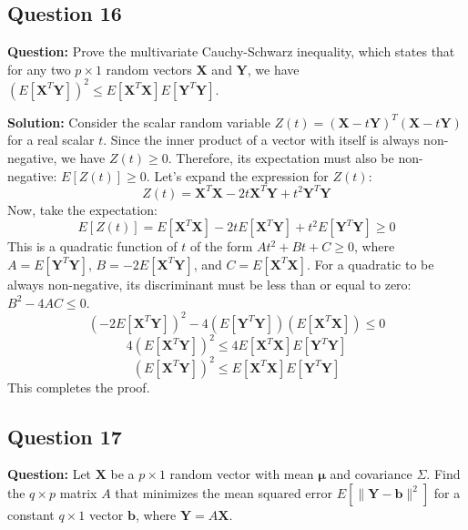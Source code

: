 \subsection*{Question 16}
\textbf{Question:} Prove the multivariate Cauchy-Schwarz inequality, which states that for any two $p \times 1$ random vectors $\mathbf{X}$ and $\mathbf{Y}$, we have $(E[\mathbf{X}^T\mathbf{Y}])^2 \le E[\mathbf{X}^T\mathbf{X}] E[\mathbf{Y}^T\mathbf{Y}]$.

\textbf{Solution:}
Consider the scalar random variable $Z(t) = (\mathbf{X} - t\mathbf{Y})^T(\mathbf{X} - t\mathbf{Y})$ for a real scalar $t$.
Since the inner product of a vector with itself is always non-negative, we have $Z(t) \ge 0$.
Therefore, its expectation must also be non-negative: $E[Z(t)] \ge 0$.
Let's expand the expression for $Z(t)$:
$$ Z(t) = \mathbf{X}^T\mathbf{X} - 2t\mathbf{X}^T\mathbf{Y} + t^2\mathbf{Y}^T\mathbf{Y} $$
Now, take the expectation:
$$ E[Z(t)] = E[\mathbf{X}^T\mathbf{X}] - 2tE[\mathbf{X}^T\mathbf{Y}] + t^2E[\mathbf{Y}^T\mathbf{Y}] \ge 0 $$
This is a quadratic function of $t$ of the form $At^2 + Bt + C \ge 0$, where $A = E[\mathbf{Y}^T\mathbf{Y}]$, $B = -2E[\mathbf{X}^T\mathbf{Y}]$, and $C = E[\mathbf{X}^T\mathbf{X}]$.
For a quadratic to be always non-negative, its discriminant must be less than or equal to zero: $B^2 - 4AC \le 0$.
$$ (-2E[\mathbf{X}^T\mathbf{Y}])^2 - 4(E[\mathbf{Y}^T\mathbf{Y}])(E[\mathbf{X}^T\mathbf{X}]) \le 0 $$
$$ 4(E[\mathbf{X}^T\mathbf{Y}])^2 \le 4 E[\mathbf{X}^T\mathbf{X}] E[\mathbf{Y}^T\mathbf{Y}] $$
$$ (E[\mathbf{X}^T\mathbf{Y}])^2 \le E[\mathbf{X}^T\mathbf{X}] E[\mathbf{Y}^T\mathbf{Y}] $$
This completes the proof.

\subsection*{Question 17}
\textbf{Question:} Let $\mathbf{X}$ be a $p \times 1$ random vector with mean $\boldsymbol{\mu}$ and covariance $\Sigma$. Find the $q \times p$ matrix $A$ that minimizes the mean squared error $E[\|\mathbf{Y} - \mathbf{b}\|^2]$ for a constant $q \times 1$ vector $\mathbf{b}$, where $\mathbf{Y} = A\mathbf{X}$.

